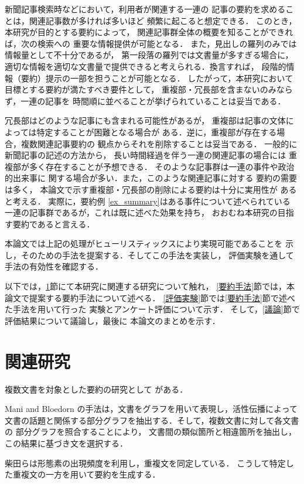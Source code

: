 新聞記事検索時などにおいて，利用者が関連する一連の
記事の要約を求めることは，関連記事数が多ければ多いほど
頻繁に起こると想定できる．
このとき，本研究が目的とする要約によって，
関連記事群全体の概要を知ることができれば，次の検索への
重要な情報提供が可能となる．
また，見出しの羅列のみでは情報量として不十分であるが，
第一段落の羅列では文書量が多すぎる場合に，
適切な情報を適切な文書量で提供できると考えられる．換言すれば，
段階的情報（要約）提示の一部を担うことが可能となる．
したがって，本研究において目標とする要約が満たすべき要件として，
重複部・冗長部を含まないのみならず，一連の記事を
時間順に並べることが挙げられていることは妥当である．

冗長部はどのような記事にも含まれる可能性があるが，
重複部は記事の文体によっては特定することが困難となる場合が
ある．逆に，重複部が存在する場合，複数関連記事要約の
観点からそれを削除することは妥当である．
一般的に新聞記事の記述の方法から，
長い時間経過を伴う一連の関連記事の場合には
重複部が多く存在することが予想できる．
そのような記事群は一連の事件や政治的出来事に
関する場合が多い．また，このような関連記事に対する
要約の需要は多く，
本論文で示す重複部・冗長部の削除による要約は十分に実用性が
あると考える．
実際に，要約例 \ref{ex_summary}はある事件について述べられている
一連の記事群であるが，これは既に述べた効果を持ち，
おおむね本研究の目指す要約であると言える．

本論文では上記の処理がヒューリスティックスにより実現可能であることを
示し，そのための手法を提案する．そしてこの手法を実装し，
評価実験を通して手法の有効性を確認する．

以下では，\ref{関連研究}節にて本研究に関連する研究について触れ，
\ref{要約手法}節では，本論文で提案する要約手法について述べる．
\ref{評価実験}節では\ref{要約手法}節で述べた手法を用いて行った
実験とアンケート評価について示す．
そして，\ref{議論}節で評価結果について議論し，最後に
本論文のまとめを示す．

\section{関連研究}
\label{関連研究}
複数文書を対象とした要約の研究として
\cite[など]{Mani97,Yamamoto96,McKeown95,Shibata97}がある．

Mani and Bloedorn の手法は，文書をグラフを用いて表現し，活性伝播によって
文書の話題と関係する部分グラフを抽出する．そして，複数文書に対して各文書の
部分グラフを照合することにより，
文書間の類似箇所と相違箇所を抽出し，この結果に基づき文を選択する．

柴田らは形態素の出現頻度を利用し，重複文を同定している．
こうして特定した重複文の一方を用いて要約を生成する．

